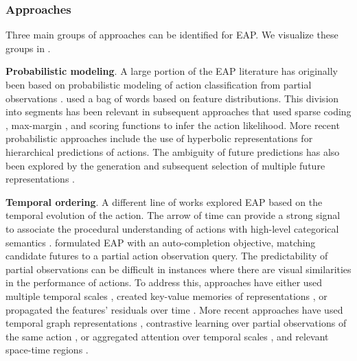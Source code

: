 \subsubsection{Approaches}

Three main groups of approaches can be identified for EAP. We visualize these groups in .

\noindent
\textbf{Probabilistic modeling}. A large portion of the EAP literature has originally been based on probabilistic modeling of action classification from partial observations \citep{cao2013recognize,hoai2014max,li2012modeling,li2014prediction,ryoo2011human}. \citet{ryoo2011human} used a bag of words based on feature distributions. This division into segments has been relevant in subsequent approaches that used sparse coding \citep{cao2013recognize}, max-margin \citep{hoai2014max}, and scoring functions \citep{li2012modeling,li2014prediction} to infer the action likelihood. More recent probabilistic approaches include the use of hyperbolic representations \citep{suris2021learning} for hierarchical predictions of actions. The ambiguity of future predictions has also been explored by the generation and subsequent selection of multiple future representations \citep{chen2022ambiguousness}.


\noindent
\textbf{Temporal ordering}. A different line of works explored EAP based on the temporal evolution of the action. The arrow of time \citep{pickup2014seeing} can provide a strong signal to associate the procedural understanding of actions with high-level categorical semantics \citep{misra2016shuffle,zhou2015temporal}. \citet{xu2015activity} formulated EAP with an auto-completion objective, matching candidate futures to a partial action observation query. The predictability of partial observations can be difficult in instances where there are visual similarities in the performance of actions. To address this, approaches have either used multiple temporal scales \citep{kong2014discriminative}, created key-value memories of representations \citep{kong2018action}, or propagated the features' residuals over time \citep{zhao2019spatiotemporal}. More recent approaches have used temporal graph representations \citep{wu2021spatial,wu2021anticipating}, contrastive learning over partial observations of the same action \citep{wang2023magi}, or aggregated attention over temporal scales \citep{stergiou2023wisdom}, and relevant space-time regions \citep{rangrej2023glitr}.


